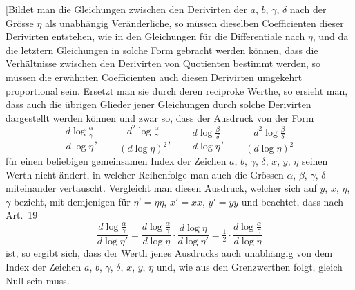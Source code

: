 \documentclass[10pt,a4paper]{article}
\begin{document}
[Bildet man die Gleichungen zwischen den Derivirten der $a$, $b$, $\gamma$,
$\delta$ nach der Gr\"osse $\eta$ als unabh\"angig Ver\"anderliche, so m\"ussen
dieselben Coefficienten dieser Derivirten entstehen, wie in den Gleichungen
f\"ur die Differentiale nach $\eta$, und da die letztern Gleichungen in solche
Form gebracht werden k\"onnen, dass die Verh\"altnisse zwischen den Derivirten
von Quotienten bestimmt werden, so m\"ussen die erw\"ahnten Coefficienten auch
diesen Derivirten umgekehrt proportional sein. Ersetzt man sie durch deren
reciproke Werthe, so ersieht man, dass auch die \"ubrigen Glieder jener
Gleichungen durch solche Derivirten dargestellt werden k\"onnen und zwar so,
dass der Ausdruck von der Form
\[
\frac{d\log\tfrac{\alpha}{\gamma}}{d\log\eta}, \qquad
\frac{d^2\log\tfrac{\alpha}{\gamma}}{(d\log\eta)^2}, \qquad
\frac{d\log\tfrac{\beta}{\delta}}{d\log\eta}, \qquad
\frac{d^2\log\tfrac{\beta}{\delta}}{(d\log\eta)^2}
\]
f\"ur einen beliebigen gemeinsamen Index der Zeichen $a$, $b$, $\gamma$,
$\delta$, $x$, $y$, $\eta$ seinen Werth nicht \"andert, in welcher Reihenfolge
man auch die Gr\"ossen $\alpha$, $\beta$, $\gamma$, $\delta$ miteinander
vertauscht. Vergleicht man diesen Ausdruck, welcher sich auf $y$, $x$, $\eta$,
$\gamma$ bezieht, mit demjenigen f\"ur $\eta' = \eta\eta$, $x' = xx$, $y' = yy$
und beachtet, dass nach Art.~19
\[
\frac{d\log\tfrac{\alpha}{\gamma}}{d\log\eta'}
 = \frac{d\log\tfrac{\alpha}{\gamma}}{d\log\eta}
   \cdot\frac{d\log\eta}{d\log\eta'}
 = \tfrac12 \cdot \frac{d\log\tfrac{\alpha}{\gamma}}{d\log\eta}
\]
ist, so ergibt sich, dass der Werth jenes Ausdrucks auch unabh\"angig von dem
Index der Zeichen $a$, $b$, $\gamma$, $\delta$, $x$, $y$, $\eta$ und, wie aus
den Grenzwerthen folgt, gleich Null sein muss.
\end{document}
